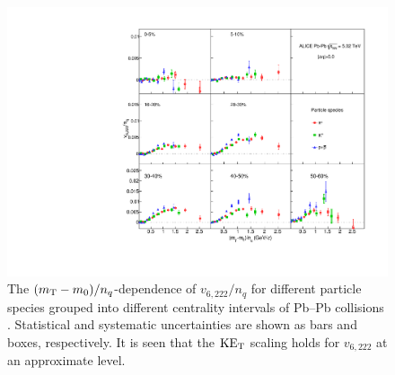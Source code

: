 \begin{figure}[htb]
\begin{center}
\includegraphics[scale=0.82]{figures/scaling/All_v6222_gap00_KET_3by3.pdf}
\end{center}
\caption{The $(m_{\rm{T}} - m_{0})/n_{q}$-dependence of $v_{6,222}/n_{q}$ for different particle species grouped into different centrality intervals of Pb--Pb collisions \sNN. Statistical and systematic uncertainties are shown as bars and boxes, respectively. It is seen that the $\rm KE_{T}$ scaling holds for $v_{6,222}$ at an approximate level.}
\label{v6222_KET}
\end{figure}
